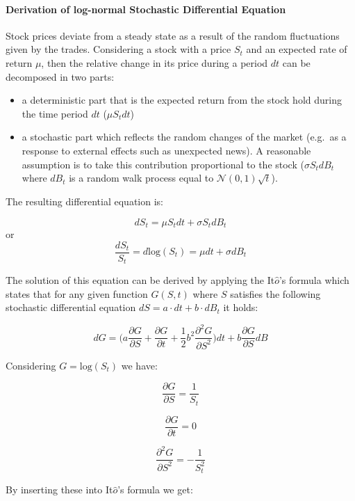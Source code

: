 \documentclass[11pt]{article}
\providecommand{\tightlist}{%
      \setlength{\itemsep}{0pt}\setlength{\parskip}{0pt}}
\begin{document}
    \hypertarget{derivation-of-log-normal-stochastic-differential-equation}{%
\paragraph{Derivation of log-normal Stochastic Differential
Equation}\label{derivation-of-log-normal-stochastic-differential-equation}}

Stock prices deviate from a steady state as a result of the random
fluctuations given by the trades. Considering a stock with a price
\(S_t\) and an expected rate of return \(\mu\), then the relative change
in its price during a period \(dt\) can be decomposed in two parts:

\begin{itemize}
\tightlist
\item
  a deterministic part that is the expected return from the stock hold
  during the time period \(dt\) (\(\mu S_tdt\))
\item
  a stochastic part which reflects the random changes of the market
  (e.g.~as a response to external effects such as unexpected news). A
  reasonable assumption is to take this contribution proportional to the
  stock (\(\sigma S_tdB_t\) where \(dB_t\) is a random walk process
  equal to \(\mathcal{N}(0,1)\sqrt{t}\)).
\end{itemize}

    The resulting differential equation is:

\[dS_t = \mu S_tdt + \sigma S_tdB_t\] or
\[\frac{dS_t}{S_t} = d\textrm{log}(S_t) = \mu dt + \sigma dB_t\]

    The solution of this equation can be derived by applying the
It\(\hat{o}\)'s formula which states that for any given function
\(G(S, t)\) where \(S\) satisfies the following stochastic differential
equation \(dS=a\cdot dt +b\cdot dB_t\) it holds:

\[dG=\big(a\frac{\partial G}{\partial S} + \frac{\partial G}{\partial t} + \frac{1}{2}b^2\frac{\partial^2 G}{\partial S^2} \big)dt + b \frac{\partial G}{\partial S}dB\]

Considering \(G = \textrm{log}(S_t)\) we have:

\[\frac{\partial G}{\partial S} = \frac{1}{S_t}\]

\[\frac{\partial G}{\partial t} = 0\]

\[\frac{\partial^2 G}{\partial S^2} = -\frac{1}{S_t^{2}}\]

    By inserting these into It\(\hat{o}\)'s formula we get:
\end{document}
